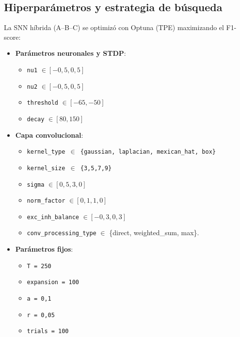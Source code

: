\subsection{Hiperparámetros y estrategia de búsqueda}
La SNN híbrida (A--B--C) se optimizó con Optuna (TPE) maximizando el F1-score:
\begin{itemize}
    \item \textbf{Parámetros neuronales y STDP}:
    \begin{itemize}
        \item \texttt{nu1} \(\in [-0{,}5, 0{,}5]\)
        \item \texttt{nu2} \(\in [-0{,}5, 0{,}5]\)
        \item \texttt{threshold} \(\in [-65, -50]\)
        \item \texttt{decay} \(\in [80, 150]\)
    \end{itemize}
    \item \textbf{Capa convolucional}:
    \begin{itemize}
        \item \texttt{kernel\_type \(\in\) \{gaussian, laplacian, mexican\_hat, box\}}
        \item \texttt{kernel\_size \(\in\) \{3,5,7,9\}}
        \item \texttt{sigma} \(\in [0{,}5, 3{,}0]\)
        \item \texttt{norm\_factor} \(\in [0{,}1, 1{,}0]\)
        \item \texttt{exc\_inh\_balance} \(\in [-0{,}3, 0{,}3]\)
        \item \texttt{conv\_processing\_type} \(\in\) \{direct, weighted\_sum, max\}.
    \end{itemize}
    \item \textbf{Parámetros fijos}: 
     \begin{itemize}
        \item  \texttt{T = 250}
        \item \texttt{expansion = 100}
        \item \texttt{a = 0{,}1}
        \item \texttt{r = 0{,}05}
        \item \texttt{trials = 100}
    \end{itemize}
\end{itemize}
